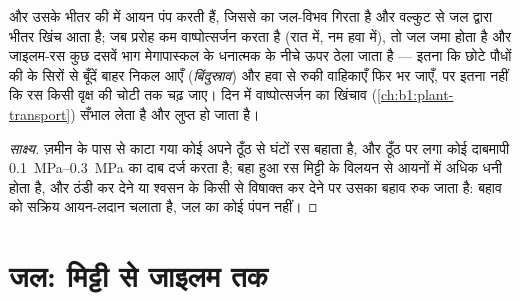 \begin{proposition}[मूल दाब]\label{prop:b1:plant-water-minerals:rootpressure}
 और उसके भीतर की   में आयन पंप करती हैं, जिससे
 का जल-विभव गिरता है और वल्कुट से जल  द्वारा भीतर खिंच आता
है; जब प्ररोह कम वाष्पोत्सर्जन करता है (रात में, नम हवा में), तो जल जमा
होता है और जाइलम-रस कुछ दसवें भाग मेगापास्कल के धनात्मक \emph{}
के नीचे ऊपर ठेला जाता है --- इतना कि छोटे पौधों की  के सिरों से
बूँदें बाहर निकल आएँ (\emph{बिंदुस्राव}) और हवा से रुकी वाहिकाएँ फिर भर
जाएँ, पर इतना नहीं कि रस किसी वृक्ष की चोटी तक चढ़ जाए। दिन में
वाष्पोत्सर्जन का खिंचाव (\cref{ch:b1:plant-transport}) सँभाल लेता है और
 लुप्त हो जाता है।
\end{proposition}
\begin{proof}[साक्ष्य]
ज़मीन के पास से काटा गया कोई  अपने ठूँठ से घंटों रस बहाता है, और ठूँठ
पर लगा कोई दाबमापी \qtyrange{0.1}{0.3}{MPa} का दाब दर्ज करता है; बहा हुआ
रस मिट्टी के विलयन से आयनों में अधिक धनी होता है, और  ठंडी कर देने
या श्वसन के किसी  से विषाक्त कर देने पर उसका बहाव रुक जाता है: बहाव
को सक्रिय आयन-लदान चलाता है, जल का कोई पंपन नहीं।
\end{proof}

\section{जल: मिट्टी से जाइलम तक}

